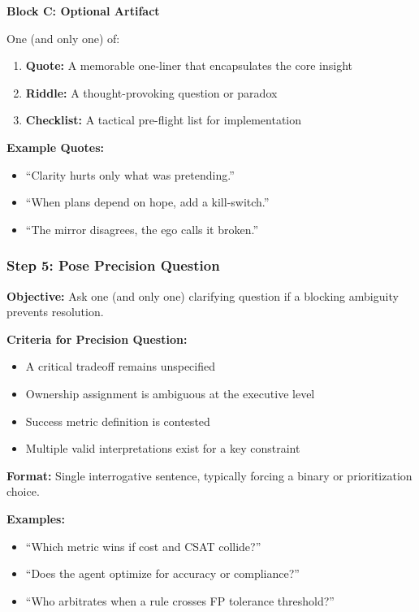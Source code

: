 \documentclass[11pt,a4paper]{article}
\begin{document}
\textbf{Block C: Optional Artifact}

One (and only one) of:
\begin{enumerate}
\item \textbf{Quote:} A memorable one-liner that encapsulates the core insight
\item \textbf{Riddle:} A thought-provoking question or paradox
\item \textbf{Checklist:} A tactical pre-flight list for implementation
\end{enumerate}

\textbf{Example Quotes:}
\begin{itemize}
\item ``Clarity hurts only what was pretending.''
\item ``When plans depend on hope, add a kill-switch.''
\item ``The mirror disagrees, the ego calls it broken.''
\end{itemize}

\subsubsection{Step 5: Pose Precision Question}

\textbf{Objective:} Ask one (and only one) clarifying question if a blocking ambiguity prevents resolution.

\textbf{Criteria for Precision Question:}
\begin{itemize}
\item A critical tradeoff remains unspecified
\item Ownership assignment is ambiguous at the executive level
\item Success metric definition is contested
\item Multiple valid interpretations exist for a key constraint
\end{itemize}

\textbf{Format:} Single interrogative sentence, typically forcing a binary or prioritization choice.

\textbf{Examples:}
\begin{itemize}
\item ``Which metric wins if cost and CSAT collide?''
\item ``Does the agent optimize for accuracy or compliance?''
\item ``Who arbitrates when a rule crosses FP tolerance threshold?''
\end{itemize}
\end{document}
